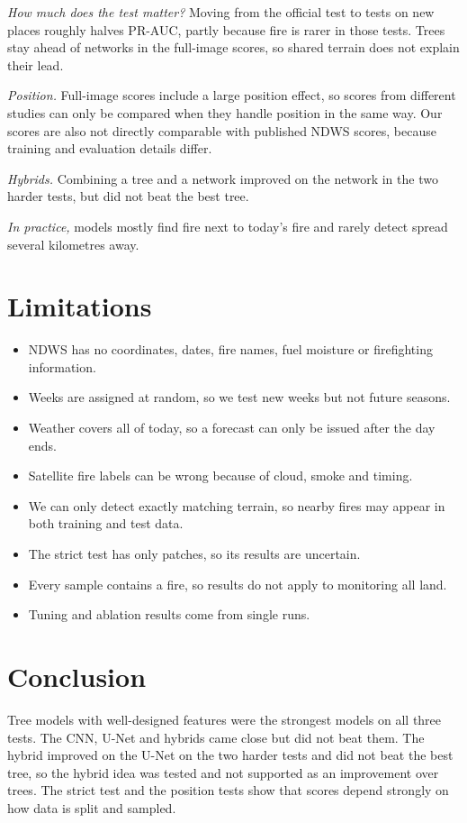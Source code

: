 \documentclass[conference]{IEEEtran}
\begin{document}
\emph{How much does the test matter?} Moving from the official test to tests on new places roughly halves PR-AUC, partly because fire is rarer in those tests. Trees stay ahead of networks in the full-image scores, so shared terrain does not explain their lead.

\emph{Position.} Full-image scores include a large position effect, so scores from different studies can only be compared when they handle position in the same way. Our scores are also not directly comparable with published NDWS scores, because training and evaluation details differ.

\emph{Hybrids.} Combining a tree and a network improved on the network in the two harder tests, but did not beat the best tree.

\emph{In practice,} models mostly find fire next to today's fire and rarely detect spread several kilometres away.

\section{Limitations}
\begin{itemize}
\item NDWS has no coordinates, dates, fire names, fuel moisture or firefighting information.
\item Weeks are assigned at random, so we test new weeks but not future seasons.
\item Weather covers all of today, so a forecast can only be issued after the day ends.
\item Satellite fire labels can be wrong because of cloud, smoke and timing.
\item We can only detect exactly matching terrain, so nearby fires may appear in both training and test data.
\item The strict test has only \rStrictTest{} patches, so its results are uncertain.
\item Every sample contains a fire, so results do not apply to monitoring all land.
\item Tuning and ablation results come from single runs.
\end{itemize}

\section{Conclusion}
Tree models with well-designed features were the strongest models on all three tests. The CNN, U-Net and hybrids came close but did not beat them. The hybrid improved on the U-Net on the two harder tests and did not beat the best tree, so the hybrid idea was tested and not supported as an improvement over trees. The strict test and the position tests show that scores depend strongly on how data is split and sampled.
\end{document}
